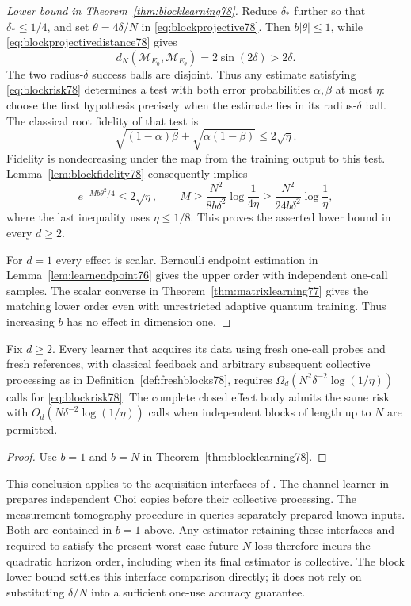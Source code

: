 \begin{proof}[Lower bound in Theorem~\ref{thm:blocklearning78}]
Reduce $\delta_*$ further so that $\delta_*\le1/4$, and set
$\theta=4\delta/N$ in \eqref{eq:blockprojective78}.
Then $b|\theta|\le1$, while
\eqref{eq:blockprojectivedistance78} gives
\[
 d_N(\mathcal M_{E_0},\mathcal M_{E_\theta})
 =2\sin(2\delta)>2\delta.
\]
The two radius-$\delta$ success balls are disjoint.  Thus any
estimate satisfying \eqref{eq:blockrisk78} determines a test with
both error probabilities $\alpha,\beta$ at most $\eta$: choose
the first hypothesis precisely when the estimate lies in its
radius-$\delta$ ball.  The classical root fidelity of that test is
\[
 \sqrt{(1-\alpha)\beta}+\sqrt{\alpha(1-\beta)}
 \le2\sqrt\eta.
\]
Fidelity is nondecreasing under the map from the training output to
this test.  Lemma~\ref{lem:blockfidelity78} consequently implies
\[
 e^{-Mb\theta^2/4}\le2\sqrt\eta,
 \qquad
 M\ge\frac{N^2}{8b\delta^2}\log\frac1{4\eta}
 \ge\frac{N^2}{24b\delta^2}\log\frac1\eta,
\]
where the last inequality uses $\eta\le1/8$.
This proves the asserted lower bound in every $d\ge2$.

For $d=1$ every effect is scalar.  Bernoulli endpoint estimation
in Lemma~\ref{lem:learnendpoint76} gives the upper order with
independent one-call samples.  The scalar converse in
Theorem~\ref{thm:matrixlearning77} gives the matching lower order
even with unrestricted adaptive quantum training.  Thus increasing
$b$ has no effect in dimension one.
\end{proof}

\begin{corollary}
\label{cor:onecallseparation78}
Fix $d\ge2$.  Every learner that acquires its data using fresh
one-call probes and fresh references, with classical feedback and
arbitrary subsequent collective processing as in
Definition~\ref{def:freshblocks78}, requires
$\Omega_d(N^2\delta^{-2}\log(1/\eta))$ calls for
\eqref{eq:blockrisk78}.  The complete closed effect body admits
the same risk with $O_d(N\delta^{-2}\log(1/\eta))$ calls when
independent blocks of length up to $N$ are permitted.
\end{corollary}
\begin{proof}
Use $b=1$ and $b=N$ in Theorem~\ref{thm:blocklearning78}.
\end{proof}

This conclusion applies to the acquisition interfaces of
\cite{MB67,ZRK76}.  The channel learner in
\cite[Section~III.2 and Algorithm~I.2]{MB67} prepares independent
Choi copies before their collective processing.  The measurement
tomography procedure in \cite[Section~3]{ZRK76} queries separately
prepared known inputs.  Both are contained in $b=1$ above.  Any
estimator retaining these interfaces and required to satisfy the
present worst-case future-$N$ loss therefore incurs the quadratic
horizon order, including when its final estimator is collective.
The block lower bound settles this interface comparison directly;
it does not rely on substituting $\delta/N$ into a sufficient
one-use accuracy guarantee.

